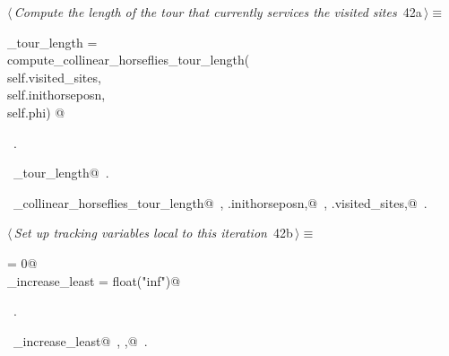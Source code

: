 \documentclass[11.5pt]{report}
\begin{document}
\begin{flushleft} \small\label{scrap48}\raggedright\small
{} $\langle\,${\itshape Compute the length of the tour that currently services the visited sites}\nobreak\ {\footnotesize {42a}}$\,\rangle\equiv$
\vspace{-1ex}
\begin{list}{}{} \item
\mbox{}\verb@current_tour_length    = \@\\
\mbox{}\verb@         compute_collinear_horseflies_tour_length(\@\\
\mbox{}\verb@                    self.visited_sites,\@\\
\mbox{}\verb@                    self.inithorseposn,\@\\
\mbox{}\verb@                    self.phi) @\\
\mbox{}\verb@@{\NWsep}
\end{list}
\vspace{-1.5ex}
\footnotesize
\begin{list}{}{\setlength{\itemsep}{-\parsep}\setlength{\itemindent}{-\leftmargin}}
\item \NWtxtMacroRefIn\ .
\item \NWtxtIdentsDefed\nobreak\  \verb@current_tour_length@\nobreak\ .\item \NWtxtIdentsUsed\nobreak\  \verb@compute_collinear_horseflies_tour_length@\nobreak\ , \verb@self.inithorseposn,@\nobreak\ , \verb@self.visited_sites,@\nobreak\ .
\item{}
\end{list}
\vspace{4ex}
\end{flushleft}
\vspace{-0.8cm}\newchunk 
\begin{flushleft} \small\label{scrap49}\raggedright\small
{} $\langle\,${\itshape Set up tracking variables local to this iteration}\nobreak\ {\footnotesize {42b}}$\,\rangle\equiv$
\vspace{-1ex}
\begin{list}{}{} \item
\mbox{}\verb@ibest                = 0@\\
\mbox{}\verb@delta_increase_least = float("inf")@\\
\mbox{}\verb@@{\NWsep}
\end{list}
\vspace{-1.5ex}
\footnotesize
\begin{list}{}{\setlength{\itemsep}{-\parsep}\setlength{\itemindent}{-\leftmargin}}
\item \NWtxtMacroRefIn\ .
\item \NWtxtIdentsDefed\nobreak\  \verb@delta_increase_least@\nobreak\ , \verb@ibest,@\nobreak\ .
\item{}
\end{list}
\vspace{4ex}
\end{flushleft}
\end{document}
